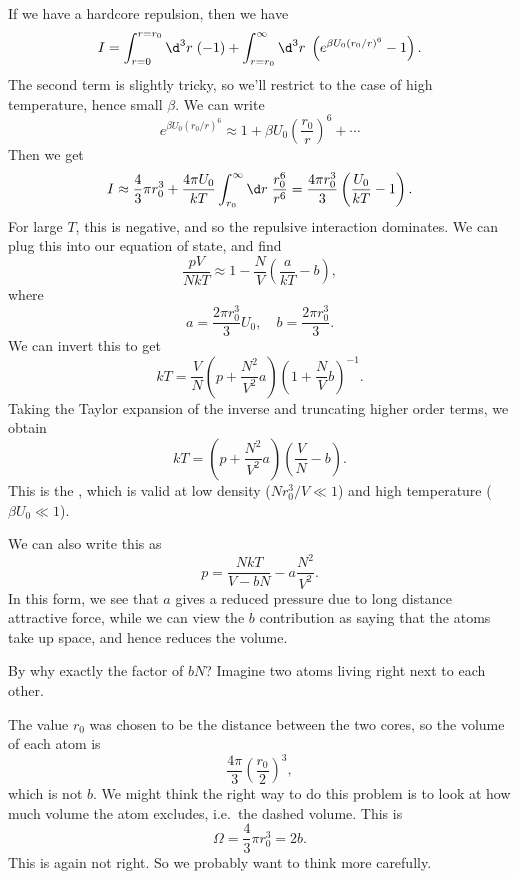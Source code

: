 \documentclass[a4paper]{article}
\begin{document}
If we have a hardcore repulsion, then we have
\[
  I = \int_{r = 0}^{r = r_0} \d^3 r\; (-1) + \int_{r = r_0}^\infty \d^3 r\; \left(e^{\beta U_0 (r_0/r)^6} - 1\right).
\]
The second term is slightly tricky, so we'll restrict to the case of high temperature, hence small $\beta$. We can write
\[
  e^{\beta U_0 (r_0/r)^6} \approx 1 + \beta U_0 \left(\frac{r_0}{r}\right)^6 + \cdots
\]
Then we get
\[
  I \approx \frac{4}{3}\pi r_0^3 +\frac{4 \pi U_0}{kT} \int_{r_0}^\infty \d r\; \frac{r_0^6}{r^6} = \frac{4\pi r_0^3}{3}\left(\frac{U_0}{kT} - 1\right).
\]
For large $T$, this is negative, and so the repulsive interaction dominates. We can plug this into our equation of state, and find
\[
  \frac{pV}{NkT} \approx 1 - \frac{N}{V}\left(\frac{a}{kT} - b\right),
\]
where
\[
  a = \frac{2\pi r_0^3}{3}U_0,\quad b = \frac{2\pi r_0^3}{3}.
\]
We can invert this to get
\[
  kT = \frac{V}{N}\left(p + \frac{N^2}{V^2} a\right) \left(1 + \frac{N}{V}b\right)^{-1}.
\]
Taking the Taylor expansion of the inverse and truncating higher order terms, we obtain
\[
  kT = \left(p + \frac{N^2}{V^2}a \right)\left(\frac{V}{N} - b\right).
\]
This is the , which is valid at low density ($Nr_0^3/V \ll 1$) and high temperature ($\beta U_0 \ll 1$).

We can also write this as
\[
  p = \frac{NkT}{V - bN} - a \frac{N^2}{V^2}.
\]
In this form, we see that $a$ gives a reduced pressure due to long distance attractive force, while we can view the $b$ contribution as saying that the atoms take up space, and hence reduces the volume.

By why exactly the factor of $bN$? Imagine two atoms living right next to each other.
\begin{center}
\end{center}
The value $r_0$ was chosen to be the distance between the two cores, so the volume of each atom is
\[
  \frac{4\pi}{3}\left(\frac{r_0}{2}\right)^3,
\]
which is not $b$. We might think the right way to do this problem is to look at how much volume the atom excludes, i.e.\ the dashed volume. This is
\[
  \Omega = \frac{4}{3}\pi r_0^3 = 2b.
\]
This is again not right. So we probably want to think more carefully.
\end{document}
